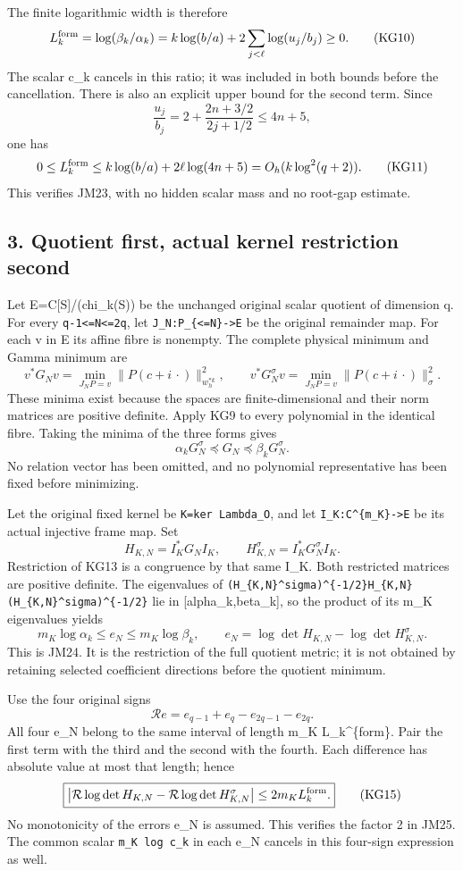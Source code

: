 The finite logarithmic width is therefore \[
L_k^{\rm form}=\log(\beta_k/\alpha_k)
=k\log(b/a)+2\sum_{j<\ell}\log(u_j/b_j)\ge0.
\tag{KG10}
\] The scalar c\_k cancels in this ratio; it was included in both bounds before the cancellation. There is also an explicit upper bound for the second term. Since \[
\frac{u_j}{b_j}=2+\frac{2n+3/2}{2j+1/2}\le4n+5,
\] one has \[
0\le L_k^{\rm form}\le k\log(b/a)+2\ell\log(4n+5)
=O_h(k\log^2(q+2)).
\tag{KG11}
\] This verifies JM23, with no hidden scalar mass and no root-gap estimate.

\subsection{3. Quotient first, actual kernel restriction second}\label{mrkg:quotient-first-actual-kernel-restriction-second}

Let E=C{[}S{]}/(chi\_k(S)) be the unchanged original scalar quotient of dimension q. For every \texttt{q-1\textless{}=N\textless{}=2q}, let \texttt{J\_N:P\_\{\textless{}=N\}-\textgreater{}E} be the original remainder map. For each v in E its affine fibre is nonempty. The complete physical minimum and Gamma minimum are \[
v^*G_Nv=\min_{J_NP=v}\|P(c+i\,\cdot)\|_{w_h^{*k}}^2,
\qquad
v^*G_N^\sigma v=\min_{J_NP=v}\|P(c+i\,\cdot)\|_\sigma^2.
\tag{KG12}
\] These minima exist because the spaces are finite-dimensional and their norm matrices are positive definite. Apply KG9 to every polynomial in the identical fibre. Taking the minima of the three forms gives \[
\alpha_kG_N^\sigma\preceq G_N\preceq\beta_kG_N^\sigma.
\tag{KG13}
\] No relation vector has been omitted, and no polynomial representative has been fixed before minimizing.

Let the original fixed kernel be \texttt{K=ker\ Lambda\_O}, and let \texttt{I\_K:C\^{}\{m\_K\}-\textgreater{}E} be its actual injective frame map. Set \[
H_{K,N}=I_K^*G_NI_K,\qquad
H_{K,N}^\sigma=I_K^*G_N^\sigma I_K.
\] Restriction of KG13 is a congruence by that same I\_K. Both restricted matrices are positive definite. The eigenvalues of \texttt{(H\_\{K,N\}\^{}sigma)\^{}\{-1/2\}H\_\{K,N\}(H\_\{K,N\}\^{}sigma)\^{}\{-1/2\}} lie in {[}alpha\_k,beta\_k{]}, so the product of its m\_K eigenvalues yields \[
m_K\log\alpha_k\le e_N\le m_K\log\beta_k,\qquad
e_N=\log\det H_{K,N}-\log\det H_{K,N}^\sigma.
\tag{KG14}
\] This is JM24. It is the restriction of the full quotient metric; it is not obtained by retaining selected coefficient directions before the quotient minimum.

Use the four original signs \[
\mathcal Re=e_{q-1}+e_q-e_{2q-1}-e_{2q}.
\] All four e\_N belong to the same interval of length m\_K L\_k\^{}\{form\}. Pair the first term with the third and the second with the fourth. Each difference has absolute value at most that length; hence \[
\boxed{\left|\mathcal R\log\det H_{K,N}
-\mathcal R\log\det H_{K,N}^\sigma\right|
\le2m_KL_k^{\rm form}.}
\tag{KG15}
\] No monotonicity of the errors e\_N is assumed. This verifies the factor 2 in JM25. The common scalar \texttt{m\_K\ log\ c\_k} in each e\_N cancels in this four-sign expression as well.

